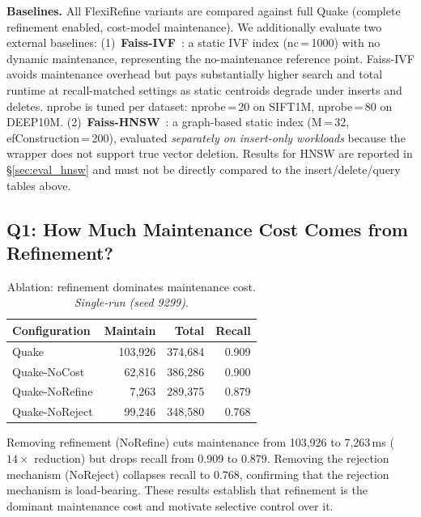 \documentclass[sigconf, nonacm]{acmart}
\newcommand{\system}{FlexiRefine\xspace}
\begin{document}
\textbf{Baselines.}
All \system variants are compared against full Quake (complete
refinement enabled, cost-model maintenance).
We additionally evaluate two external baselines:
(1)~\textbf{Faiss-IVF}~\cite{johnson2019billion}: a static IVF index
(nc\,=\,1000) with no dynamic maintenance, representing the
no-maintenance reference point. Faiss-IVF avoids maintenance overhead
but pays substantially higher search and total runtime at
recall-matched settings as static centroids degrade under inserts and
deletes. nprobe is tuned per dataset: nprobe\,=\,20 on SIFT1M,
nprobe\,=\,80 on DEEP10M.
(2)~\textbf{Faiss-HNSW}~\cite{malkov2018efficient}: a graph-based
static index (M\,=\,32, efConstruction\,=\,200), evaluated
\emph{separately on insert-only workloads} because the wrapper does
not support true vector deletion. Results for HNSW are reported in
\S\ref{sec:eval_hnsw} and must not be directly compared to the
insert/delete/query tables above.


\subsection{Q1: How Much Maintenance Cost Comes from Refinement?}
\label{sec:eval_q1}

\begin{table}[h]
\centering
\caption{Ablation: refinement dominates maintenance cost.
  \textit{Single-run (seed 9299)}.}
\label{tab:ablation}
\begin{tabular}{lrrr}
  \toprule
  Configuration & Maintain & Total & Recall \\
  \midrule
  Quake              & 103,926 & 374,684 & 0.909 \\
  Quake-NoCost       &  62,816 & 386,286 & 0.900 \\
  Quake-NoRefine     &   7,263 & 289,375 & 0.879 \\
  Quake-NoReject     &  99,246 & 348,580 & 0.768 \\
  \bottomrule
\end{tabular}
\end{table}

Removing refinement (NoRefine) cuts maintenance from 103,926 to 7,263\,ms
($14\times$ reduction) but drops recall from 0.909 to 0.879. Removing
the rejection mechanism (NoReject) collapses recall to 0.768, confirming
that the rejection mechanism is load-bearing. These results establish
that refinement is the dominant maintenance cost and motivate selective
control over it.
\end{document}
